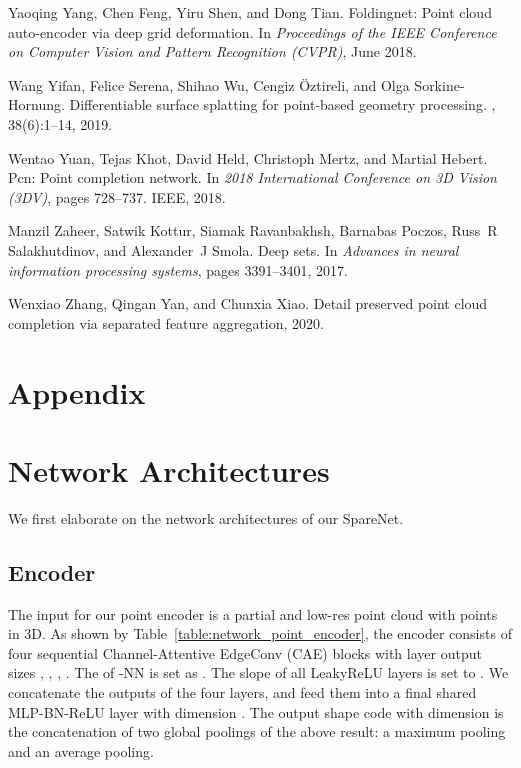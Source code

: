 \documentclass[final]{cvpr}
\begin{document}
{\begin{thebibliography}{10}
Yaoqing Yang, Chen Feng, Yiru Shen, and Dong Tian.
\newblock Foldingnet: Point cloud auto-encoder via deep grid deformation.
\newblock In {\em Proceedings of the IEEE Conference on Computer Vision and
  Pattern Recognition (CVPR)}, June 2018.

Wang Yifan, Felice Serena, Shihao Wu, Cengiz {\"O}ztireli, and Olga
  Sorkine-Hornung.
\newblock Differentiable surface splatting for point-based geometry processing.
, 38(6):1--14, 2019.

Wentao Yuan, Tejas Khot, David Held, Christoph Mertz, and Martial Hebert.
\newblock Pcn: Point completion network.
\newblock In {\em 2018 International Conference on 3D Vision (3DV)}, pages
  728--737. IEEE, 2018.

Manzil Zaheer, Satwik Kottur, Siamak Ravanbakhsh, Barnabas Poczos, Russ~R
  Salakhutdinov, and Alexander~J Smola.
\newblock Deep sets.
\newblock In {\em Advances in neural information processing systems}, pages
  3391--3401, 2017.

Wenxiao Zhang, Qingan Yan, and Chunxia Xiao.
\newblock Detail preserved point cloud completion via separated feature
  aggregation, 2020.

\end{thebibliography}
 
}
\onecolumn 
\appendix

\section*{Appendix}

\section{Network Architectures}
We first elaborate on the network architectures of our SpareNet.

\subsection{Encoder}
The input for our point encoder  is a partial and low-res point cloud  with  points in 3D.
As shown by Table~\ref{table:network_point_encoder}, the encoder  consists of four sequential Channel-Attentive EdgeConv (CAE) blocks with layer output sizes , , , . The  of -NN is set as . The slope of all LeakyReLU layers is set to .
We concatenate the outputs of the four layers, and feed them into a final shared MLP-BN-ReLU layer with dimension . 
The output shape code  with dimension  is the concatenation of two global poolings of the above result: a maximum pooling and an average pooling.
\end{document}
